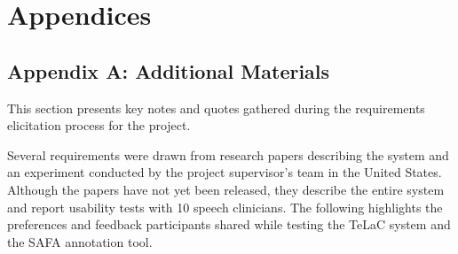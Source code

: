 \documentclass[12pt]{article}
\begin{document}
\section{Appendices}

\subsection{Appendix A: Additional Materials} \label{sec:AppendixA}

This section presents key notes and quotes gathered during the requirements elicitation process for the project.


Several requirements were drawn from research papers describing the system and an experiment conducted by the project supervisor’s team in the United States. 
Although the papers have not yet been released, they describe the entire system and report usability tests with 10 speech clinicians. 
The following highlights the preferences and feedback participants shared while testing the TeLaC system and the SAFA annotation tool.
\end{document}
